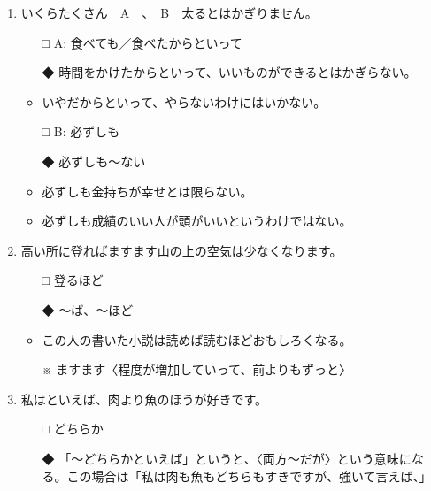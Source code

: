 \documentclass[
uplatex,
b5paper,
10pt,
dvipdfmx
]{jsbook}
\begin{document}
\begin{enumerate}
 \item いくらたくさん\underline{　A　}、\underline{　B　}太るとはかぎりません。
\begin{itemize}
 \item[□] A: 食べても／食べたからといって
 \item[◆] 時間をかけたからといって、いいものができるとはかぎらない。
\end{itemize}
\begin{itemize}
 \item いやだからといって、やらないわけにはいかない。
\end{itemize}
\begin{itemize}
 \item[□] B: 必ずしも
 \item[◆] 必ずしも〜ない
\end{itemize}
\begin{itemize}
 \item 必ずしも金持ちが幸せとは限らない。
 \item 必ずしも成績のいい人が頭がいいというわけではない。
\end{itemize}

 \item 高い所に登れば\underline{\hspace{3zw}}ますます山の上の空気は少なくなります。
\begin{itemize}
 \item[□] 登るほど
 \item[◆] 〜ば、〜ほど
\end{itemize}
\begin{itemize}
 \item この人の書いた小説は読めば読むほどおもしろくなる。
 \item[※] ますます〈程度が増加していって、前よりもずっと〉
\end{itemize}

 \item 私は\underline{\hspace{3zw}}といえば、肉より魚のほうが好きです。
\begin{itemize}
 \item[□] どちらか
 \item[◆] 「〜どちらかといえば」というと、〈両方〜だが〉という意味にな
	   る。この場合は「私は肉も魚もどちらもすきですが、強いて言えば、」
\end{itemize}
\end{enumerate}
\end{document}
